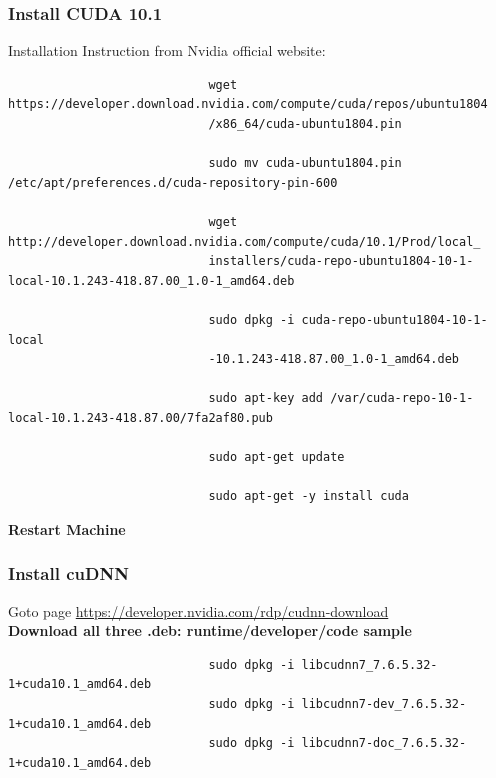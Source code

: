 					\subsubsection*{Install CUDA 10.1}
						Installation Instruction from Nvidia official website:
						
						\begin{verbatim}
							wget https://developer.download.nvidia.com/compute/cuda/repos/ubuntu1804
							/x86_64/cuda-ubuntu1804.pin

							sudo mv cuda-ubuntu1804.pin /etc/apt/preferences.d/cuda-repository-pin-600

							wget http://developer.download.nvidia.com/compute/cuda/10.1/Prod/local_
							installers/cuda-repo-ubuntu1804-10-1-local-10.1.243-418.87.00_1.0-1_amd64.deb

							sudo dpkg -i cuda-repo-ubuntu1804-10-1-local
							-10.1.243-418.87.00_1.0-1_amd64.deb

							sudo apt-key add /var/cuda-repo-10-1-local-10.1.243-418.87.00/7fa2af80.pub

							sudo apt-get update

							sudo apt-get -y install cuda
						\end{verbatim}
						\textbf{Restart Machine}
					
					\subsubsection*{Install cuDNN}
						Goto page \href{https://developer.nvidia.com/rdp/cudnn-download}{https://developer.nvidia.com/rdp/cudnn-download}\\
						\textbf{Download all three .deb: runtime/developer/code sample}

						\begin{verbatim}
							sudo dpkg -i libcudnn7_7.6.5.32-1+cuda10.1_amd64.deb
							sudo dpkg -i libcudnn7-dev_7.6.5.32-1+cuda10.1_amd64.deb
							sudo dpkg -i libcudnn7-doc_7.6.5.32-1+cuda10.1_amd64.deb
						\end{verbatim}

